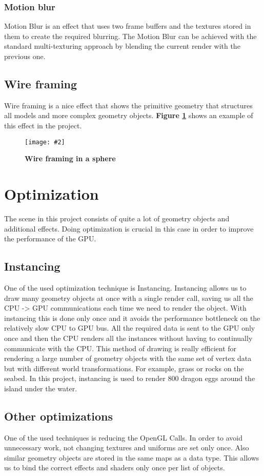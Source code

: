 \documentclass[10pt, a4paper]{article}
\newcommand{\figuremacro}[5]{
    \begin{figure}[#1]
        \centering
        \texttt{[image: \#2]}
        \caption[#3]{\textbf{#3}#4}
        \label{fig:#2}
    \end{figure}
}
\begin{document}
	\subsubsection{Motion blur}
	Motion Blur is an effect that uses two frame buffers and the textures stored in them to create the required blurring. The Motion Blur can be achieved with the standard multi-texturing approach by blending the current render with the previous one.
	\subsection{Wire framing}
	Wire framing is a nice effect that shows the primitive geometry that structures all models and more complex geometry objects. \textbf{Figure {\ref{fig:wireFraming}}} shows an example of this effect in the project.
	\figuremacro{h}{wireFraming}{Wire framing in a sphere}{ }{1.0}
	\section{Optimization}
	The scene in this project consists of quite a lot of geometry objects and additional effects. Doing optimization is crucial in this case in order to improve the performance of the GPU.
	\subsection{Instancing}
	One of the used optimization technique is Instancing. Instancing  allows us to draw many geometry objects at once with a single render call, saving us all the CPU -> GPU communications each time we need to render the object. With instancing this is done only once and it avoids the performance bottleneck on the relatively slow CPU to GPU bus. All the required data is sent to the GPU only once and then the CPU renders all the instances without having to continually communicate with the CPU. This method of drawing is really efficient for rendering a large number of geometry objects with the same set of vertex data but with different world transformations. For example, grass or rocks on the seabed. In this project, instancing is used to render 800 dragon eggs around the island under the water.
	\subsection{Other optimizations}
	One of the used techniques is reducing the OpenGL Calls. In order to avoid unnecessary work, not changing textures and uniforms are set only once. Also similar geometry objects are stored in the same maps as a data type. This allows us to bind the correct effects and shaders only once per list of objects.
	
\end{document}
